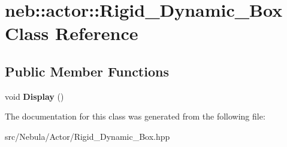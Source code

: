 \hypertarget{classneb_1_1actor_1_1Rigid__Dynamic__Box}{\section{neb\-:\-:actor\-:\-:\-Rigid\-\_\-\-Dynamic\-\_\-\-Box \-Class \-Reference}
\label{classneb_1_1actor_1_1Rigid__Dynamic__Box}
}
\subsection*{\-Public \-Member \-Functions}
\begin{DoxyCompactItemize}
\item 
\hypertarget{classneb_1_1actor_1_1Rigid__Dynamic__Box_ad2564e54df3b07cc2454ba28a026b765}{void {\bfseries \-Display} ()}\label{classneb_1_1actor_1_1Rigid__Dynamic__Box_ad2564e54df3b07cc2454ba28a026b765}

\end{DoxyCompactItemize}


\-The documentation for this class was generated from the following file\-:\begin{DoxyCompactItemize}
\item 
src/\-Nebula/\-Actor/\-Rigid\-\_\-\-Dynamic\-\_\-\-Box.\-hpp\end{DoxyCompactItemize}
